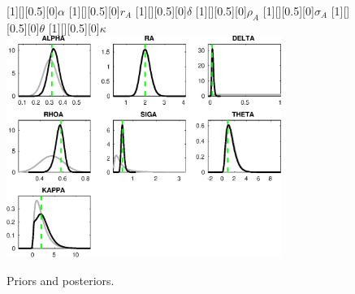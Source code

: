  
\begin{figure}[H]
[1][][0.5][0]{$ {\alpha} $}
[1][][0.5][0]{$ {r_{A}} $}
[1][][0.5][0]{$ {\delta} $}
[1][][0.5][0]{$ {\rho_A} $}
[1][][0.5][0]{$ {\sigma_A} $}
[1][][0.5][0]{$ {\theta} $}
[1][][0.5][0]{$ {\kappa} $}
\centering
\includegraphics[width=0.80\textwidth]{KimModTheBuilder/Output/KimModTheBuilder_PriorsAndPosteriors1}
\caption{Priors and posteriors.}\label{Fig:PriorsAndPosteriors:1}
\end{figure}
 
